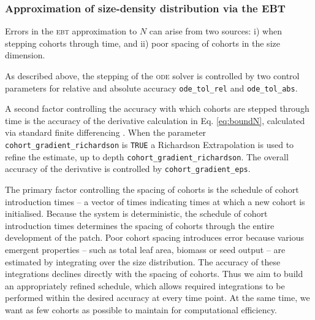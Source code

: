 \documentclass[10pt,twoside]{article}
\begin{document}
\subsubsection{Approximation of size-density distribution via the EBT}
\label{approximation-of-size-density-distribution-via-the-ebt}

Errors in the \textsc{ebt} approximation to \(N\) can arise from two sources:
i) when stepping cohorts through time, and
ii) poor spacing of cohorts in the size dimension.

As described above, the stepping of the \textsc{ode} solver is controlled by two
control parameters for relative and absolute accuracy
\texttt{ode\_tol\_rel} and \texttt{ode\_tol\_abs}.

A second factor controlling the accuracy with which cohorts are stepped
through time is the accuracy of the derivative calculation in Eq.
\ref{eq:boundN}, calculated via standard finite differencing
\citep{Abramowitz-2012}. When the parameter
\texttt{cohort\_gradient\_richardson} is \texttt{TRUE} a Richardson Extrapolation
\citep{Stoer-2002} is used to refine the estimate, up to depth
\texttt{cohort\_gradient\_richardson}. The overall accuracy of the
derivative is controlled by \texttt{cohort\_gradient\_eps}.

The primary factor controlling the spacing of cohorts is the schedule of
cohort introduction times -- a vector of times indicating times at which
a new cohort is initialised. Because the system is deterministic, the
schedule of cohort introduction times determines the spacing of cohorts
through the entire development of the patch. Poor cohort spacing
introduces error because various emergent properties -- such as total
leaf area, biomass or seed output -- are estimated by integrating over
the size distribution. The accuracy of these integrations declines
directly with the spacing of cohorts. Thus we aim to build an
appropriately refined schedule, which allows required integrations to be
performed within the desired accuracy at every time point. At the same
time, we want as few cohorts as possible to maintain for computational
efficiency.
\end{document}
